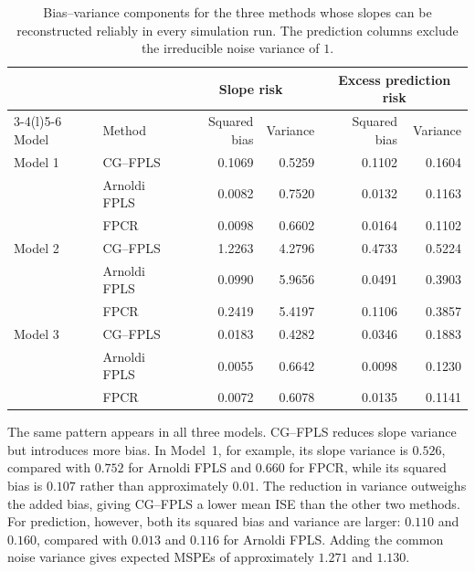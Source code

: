 \begin{table}[htbp]
    \centering
    \small
    \caption[Bias--variance components for CG--FPLS, Arnoldi FPLS, and FPCR]{Bias--variance components for the three methods whose slopes can
    be reconstructed reliably in every simulation run.  The prediction
    columns exclude the irreducible noise variance of $1$.}
    \label{tab:results-bias-variance}
    \begin{tabular}{@{}llrrrr@{}}
        \toprule
        & & \multicolumn{2}{c}{Slope risk}
          & \multicolumn{2}{c}{Excess prediction risk} \\
        \cmidrule(lr){3-4}\cmidrule(l){5-6}
        Model & Method & Squared bias & Variance & Squared bias & Variance \\
        \midrule
        Model 1 & CG--FPLS     & 0.1069 & 0.5259 & 0.1102 & 0.1604 \\
                & Arnoldi FPLS & 0.0082 & 0.7520 & 0.0132 & 0.1163 \\
                & FPCR         & 0.0098 & 0.6602 & 0.0164 & 0.1102 \\
        \addlinespace
        Model 2 & CG--FPLS     & 1.2263 & 4.2796 & 0.4733 & 0.5224 \\
                & Arnoldi FPLS & 0.0990 & 5.9656 & 0.0491 & 0.3903 \\
                & FPCR         & 0.2419 & 5.4197 & 0.1106 & 0.3857 \\
        \addlinespace
        Model 3 & CG--FPLS     & 0.0183 & 0.4282 & 0.0346 & 0.1883 \\
                & Arnoldi FPLS & 0.0055 & 0.6642 & 0.0098 & 0.1230 \\
                & FPCR         & 0.0072 & 0.6078 & 0.0135 & 0.1141 \\
        \bottomrule
    \end{tabular}
\end{table}

The same pattern appears in all three models.  CG--FPLS reduces slope
variance but introduces more bias.  In Model~1, for example, its slope
variance is $0.526$, compared with $0.752$ for Arnoldi FPLS and $0.660$ for
FPCR, while its squared bias is $0.107$ rather than approximately $0.01$.
The reduction in variance outweighs the added bias, giving CG--FPLS a lower
mean ISE than the other two methods.  For prediction, however, both its
squared bias and variance are larger: $0.110$ and $0.160$, compared with
$0.013$ and $0.116$ for Arnoldi FPLS.  Adding the common noise variance gives
expected MSPEs of approximately $1.271$ and $1.130$.

